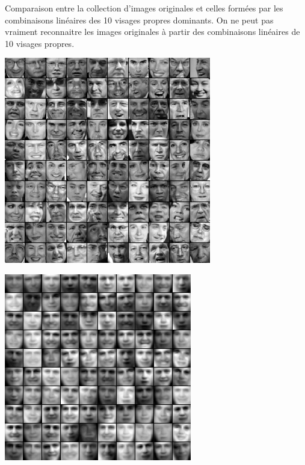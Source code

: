 \begin{adjmulticols}{1}{0in}{-2in}
\begin{center}
\begin{minipage}{0.4\textwidth}
Comparaison entre la collection d'images originales
et celles formées par les combinaisons linéaires des
10 visages propres dominants.  On ne peut pas vraiment reconnaitre
les images originales à partir des combinaisons linéaires de 10 visages
propres.
\end{minipage}
\hfill
\begin{minipage}{0.45\textwidth}
\includegraphics[width=\linewidth]{./images/faces}
\end{minipage}
\hfill
\begin{minipage}{0.45\textwidth}
\includegraphics[width=\linewidth]{./images/faces10}
\end{minipage}
\end{center}


\end{adjmulticols}

